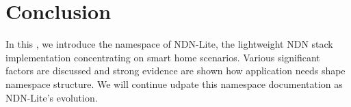 \section{Conclusion}
\label{sect:conclusion}

In this \paper, we introduce the namespace of NDN-Lite, the lightweight NDN stack implementation concentrating on smart home scenarios.
Various significant factors are discussed and strong evidence are shown how application needs shape namespace structure.
We will continue udpate this namespace documentation as NDN-Lite's evolution.
